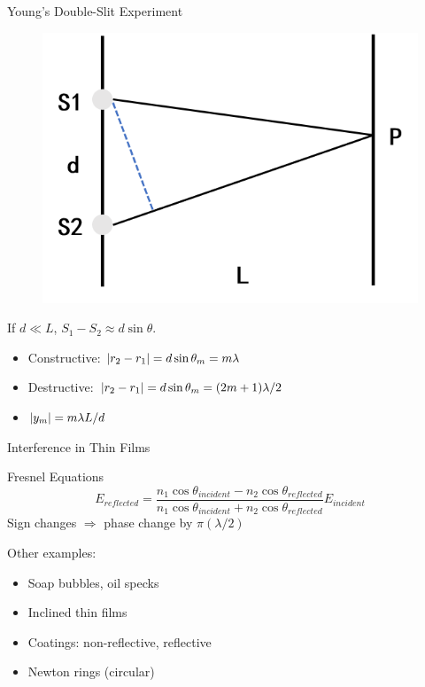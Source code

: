 \documentclass{beamer}
\begin{document}
\begin{frame}{Young's Double-Slit Experiment}
    \begin{figure}[htbp]
        \centering
        \includegraphics[scale=0.5]{images/young.png}
    \end{figure}

    If $d\ll L$, $S_1-S_2\approx d\sin\theta$.
    \begin{itemize}
        \item Constructive: $\abs{r_2-r_1}=d\sin\theta_m=m\lambda$
        \item Destructive: $\abs{r_2-r_1}=d\sin\theta_m= (2m+1)\lambda/2$
        \item $\abs{y_m} = m\lambda L/d$
    \end{itemize}
\end{frame}

\begin{frame}{Interference in Thin Films}
    \begin{beamerboxesrounded}[shadow=true]{Fresnel Equations}
        \begin{equation}
            E_{reflected} = \frac{n_1\cos\theta_{incident}-n_2\cos\theta_{reflected}}{n_1\cos\theta_{incident}+n_2\cos\theta_{reflected}} E_{incident}
        \end{equation}        
        Sign changes $\Rightarrow$ phase change by $\pi (\lambda/2)$ 
    \end{beamerboxesrounded}
    \vspace{.5em}
    Other examples:
    \begin{itemize}
        \item Soap bubbles, oil specks
        \item Inclined thin films
        \item Coatings: non-reflective, reflective
        \item Newton rings (circular)
    \end{itemize}
\end{frame}
\end{document}
